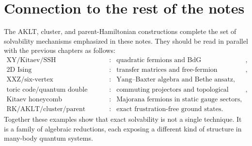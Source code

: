 \section{Connection to the rest of the notes}
\label{sec:exact-ground-state-models-connections}

The AKLT, cluster, and parent-Hamiltonian constructions complete the set of
solvability mechanisms emphasized in these notes.  They should be read in
parallel with the previous chapters as follows:
\begin{equation}
\label{eq:solvability-mechanism-chain-final}
\begin{array}{ccl}
\text{XY/Kitaev/SSH} &:& \text{quadratic fermions and BdG diagonalization},\\[2pt]
\text{2D Ising} &:& \text{transfer matrices and free-fermion structure},\\[2pt]
\text{XXZ/six-vertex} &:& \text{Yang--Baxter algebra and Bethe ansatz},\\[2pt]
\text{toric code/quantum double} &:& \text{commuting projectors and topological constraints},\\[2pt]
\text{Kitaev honeycomb} &:& \text{Majorana fermions in static gauge sectors},\\[2pt]
\text{RK/AKLT/cluster/parent models} &:& \text{exact frustration-free ground states}.
\end{array}
\end{equation}
Together these examples show that exact solvability is not a single technique.
It is a family of algebraic reductions, each exposing a different kind of
structure in many-body quantum systems.
